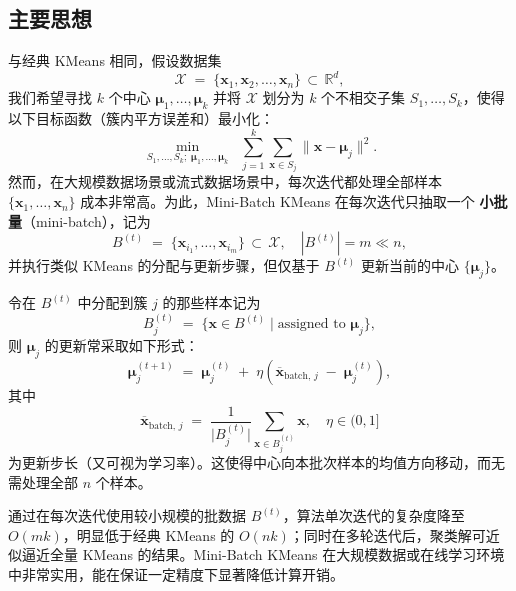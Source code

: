 \documentclass[12pt]{article}  %
\begin{document}
\subsection{主要思想}
与经典 KMeans 相同，假设数据集
\[
  \mathcal{X} \;=\; \{\mathbf{x}_1,\mathbf{x}_2,\dots,\mathbf{x}_n\} \,\subset \,\mathbb{R}^d,
\]
我们希望寻找 $k$ 个中心 $\boldsymbol{\mu}_1,\dots,\boldsymbol{\mu}_k$ 并将 $\mathcal{X}$ 划分为 $k$ 个不相交子集 $S_1,\dots,S_k$，使得以下目标函数（簇内平方误差和）最小化：
\[
  \min_{S_1,\dots,S_k;\;\boldsymbol{\mu}_1,\dots,\boldsymbol{\mu}_k}
  \;\;
  \sum_{j=1}^k 
  \sum_{\mathbf{x}\in S_j}
  \|\mathbf{x} - \boldsymbol{\mu}_j\|^2.
\]
然而，在大规模数据场景或流式数据场景中，每次迭代都处理全部样本 $\{\mathbf{x}_1,\dots,\mathbf{x}_n\}$ 成本非常高。为此，Mini-Batch KMeans 在每次迭代只抽取一个 \textbf{小批量}（mini-batch），记为
\[
  B^{(t)} \;=\; \{\mathbf{x}_{i_1}, \dots, \mathbf{x}_{i_m}\} \,\subset \,\mathcal{X}, 
  \quad |B^{(t)}| = m \ll n,
\]
并执行类似 KMeans 的分配与更新步骤，但仅基于 $B^{(t)}$ 更新当前的中心 $\{\boldsymbol{\mu}_j\}$。

令在 $B^{(t)}$ 中分配到簇 $j$ 的那些样本记为
\[
  B^{(t)}_j 
  \;=\; 
  \bigl\{\mathbf{x} \in B^{(t)} \mid \text{assigned to } \boldsymbol{\mu}_j\bigr\},
\]
则 $\boldsymbol{\mu}_j$ 的更新常采取如下形式：
\[
  \boldsymbol{\mu}_j^{(t+1)} 
  \;=\;
  \boldsymbol{\mu}_j^{(t)} 
  \;+\; \eta 
  \left(
    \overline{\mathbf{x}}_{\text{batch},\,j} 
    \;-\;
    \boldsymbol{\mu}_j^{(t)}
  \right),
\]
其中
\[
  \overline{\mathbf{x}}_{\text{batch},\,j}
  \;=\;
  \frac{1}{\bigl|B_j^{(t)}\bigr|}
  \sum_{\mathbf{x} \in B_j^{(t)}} 
  \mathbf{x}, 
\quad
  \eta \in (0,1]
\]
为更新步长（又可视为学习率）。这使得中心向本批次样本的均值方向移动，而无需处理全部 $n$ 个样本。

通过在每次迭代使用较小规模的批数据 $B^{(t)}$，算法单次迭代的复杂度降至 $O(mk)$，明显低于经典 KMeans 的 $O(nk)$；同时在多轮迭代后，聚类解可近似逼近全量 KMeans 的结果。Mini-Batch KMeans 在大规模数据或在线学习环境中非常实用，能在保证一定精度下显著降低计算开销。
\end{document}

